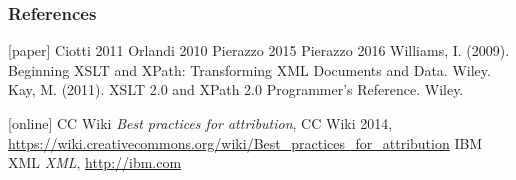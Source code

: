 
\begin{frame}
    \frametitle{References}
    \addtocounter{nframe}{1}
    \begin{thebibliography}{10}

        [paper]
        \tiny{} Ciotti 2011
        \tiny{} Orlandi 2010
        \tiny{} Pierazzo 2015
        \tiny{} Pierazzo 2016
        \tiny{} Williams, I. (2009). Beginning XSLT and XPath: Transforming XML Documents and Data. Wiley.
        \tiny{} Kay, M. (2011). XSLT 2.0 and XPath 2.0 Programmer’s Reference. Wiley.

        [online]
        \tiny{} CC Wiki \textit{Best practices for attribution}, CC Wiki 2014, \url{https://wiki.creativecommons.org/wiki/Best\_practices\_for\_attribution}
        \tiny{} IBM XML \textit{XML}, \url{http://ibm.com}

    \end{thebibliography}

\end{frame}
